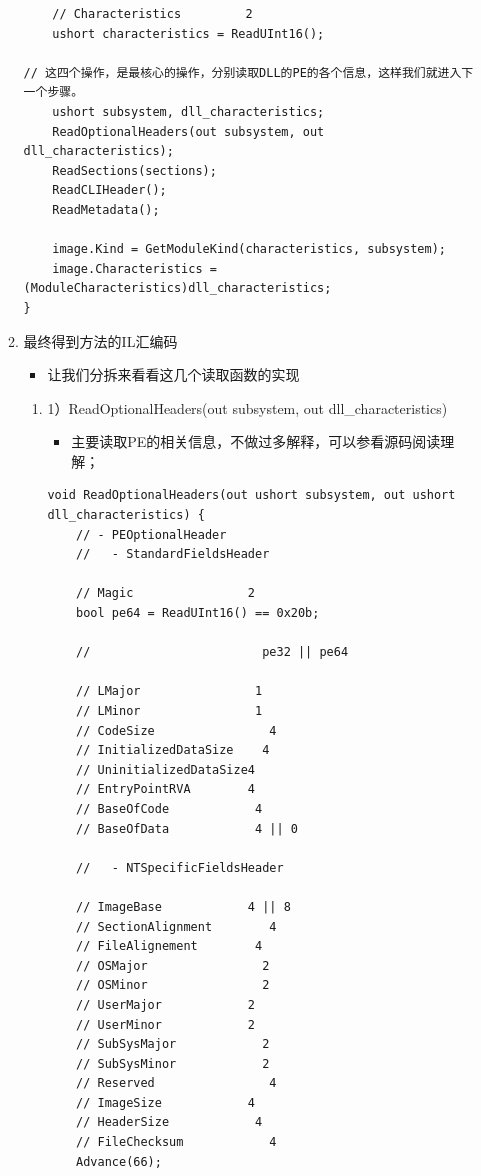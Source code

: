 \documentclass[9pt, b5paper]{article}
\begin{document}
\begin{enumerate}
\begin{enumerate}
\begin{verbatim}
    // Characteristics         2
    ushort characteristics = ReadUInt16();

// 这四个操作，是最核心的操作，分别读取DLL的PE的各个信息，这样我们就进入下一个步骤。
    ushort subsystem, dll_characteristics;
    ReadOptionalHeaders(out subsystem, out dll_characteristics);
    ReadSections(sections);
    ReadCLIHeader();
    ReadMetadata();

    image.Kind = GetModuleKind(characteristics, subsystem);
    image.Characteristics = (ModuleCharacteristics)dll_characteristics;
}
\end{verbatim}
\item 最终得到方法的IL汇编码
\label{sec-10-1-3-1-3}
\begin{itemize}
\item 让我们分拆来看看这几个读取函数的实现
\end{itemize}
\begin{enumerate}
\item 1）ReadOptionalHeaders(out subsystem, out dll\_characteristics)
\label{sec-10-1-3-1-3-1}
\begin{itemize}
\item 主要读取PE的相关信息，不做过多解释，可以参看源码阅读理解；
\end{itemize}
\begin{verbatim}
void ReadOptionalHeaders(out ushort subsystem, out ushort dll_characteristics) {
    // - PEOptionalHeader
    //   - StandardFieldsHeader

    // Magic                2
    bool pe64 = ReadUInt16() == 0x20b;

    //                        pe32 || pe64

    // LMajor                1
    // LMinor                1
    // CodeSize                4
    // InitializedDataSize    4
    // UninitializedDataSize4
    // EntryPointRVA        4
    // BaseOfCode            4
    // BaseOfData            4 || 0

    //   - NTSpecificFieldsHeader

    // ImageBase            4 || 8
    // SectionAlignment        4
    // FileAlignement        4
    // OSMajor                2
    // OSMinor                2
    // UserMajor            2
    // UserMinor            2
    // SubSysMajor            2
    // SubSysMinor            2
    // Reserved                4
    // ImageSize            4
    // HeaderSize            4
    // FileChecksum            4
    Advance(66);


\end{verbatim}
\end{enumerate}
\end{enumerate}
\end{enumerate}
\end{document}
